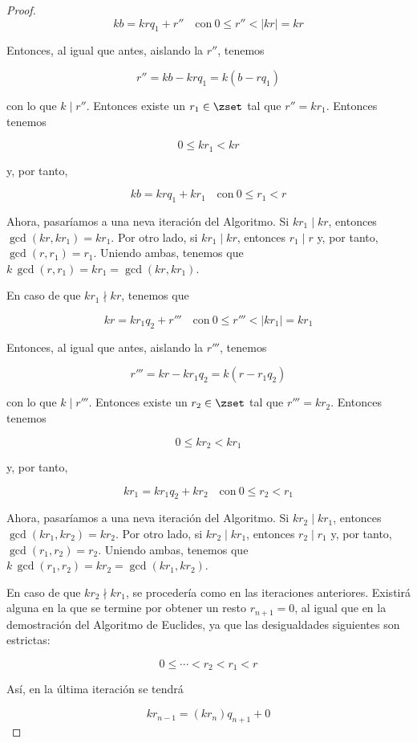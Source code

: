 \begin{proof}
  $$ kb = krq_1 + r'' \quad \text{con} \ 0 \leq r'' < |kr| = kr $$

  Entonces, al igual que antes, aislando la $r''$, tenemos

  $$ r'' = kb - krq_1 = k(b - rq_1) $$

  \noindent con lo que $k \mid r''$. Entonces existe un $r_1 \in \zset$ tal
  que $r'' = k r_1$. Entonces tenemos

  $$ 0 \leq kr_1 < kr $$

  \noindent y, por tanto,

  $$ kb = krq_1 + kr_1 \quad \text{con} \ 0 \leq r_1 < r $$

  Ahora, pasaríamos a una neva iteración del Algoritmo. Si $kr_1 \mid kr$,
  entonces $\gcd(kr, kr_1) = kr_1$. Por otro lado, si $kr_1 \mid kr$,
  entonces $r_1 \mid r$ y, por tanto, $\gcd(r, r_1) = r_1$. Uniendo ambas,
  tenemos que $k \, \gcd(r, r_1) = kr_1 = \gcd(kr, kr_1)$.

  En caso de que $kr_1 \nmid kr$, tenemos que

  $$ kr = kr_1q_2 + r''' \quad \text{con} \ 0 \leq r''' < |kr_1| = kr_1 $$

  Entonces, al igual que antes, aislando la $r'''$, tenemos

  $$ r''' = kr - kr_1q_2 = k(r - r_1q_2) $$

  \noindent con lo que $k \mid r'''$. Entonces existe un $r_2 \in \zset$ tal
  que $r''' = k r_2$. Entonces tenemos

  $$ 0 \leq kr_2 < kr_1 $$

  \noindent y, por tanto,

  $$ kr_1 = kr_1q_2 + kr_2 \quad \text{con} \ 0 \leq r_2 < r_1 $$

  Ahora, pasaríamos a una neva iteración del Algoritmo. Si $kr_2 \mid kr_1$,
  entonces $\gcd(kr_1, kr_2) = kr_2$. Por otro lado, si $kr_2 \mid kr_1$,
  entonces $r_2 \mid r_1$ y, por tanto, $\gcd(r_1, r_2) = r_2$. Uniendo
  ambas, tenemos que $k \, \gcd(r_1, r_2) = kr_2 = \gcd(kr_1, kr_2)$.

  En caso de que $kr_2 \nmid kr_1$, se procedería como en las iteraciones
  anteriores. Existirá alguna en la que se termine por obtener un resto
  $r_{n+1} = 0$, al igual que en la demostración del Algoritmo de Euclides,
  ya que las desigualdades siguientes son estrictas:

  $$ 0 \leq \cdots < r_2 < r_1 < r $$

  Así, en la última iteración se tendrá

  $$ kr_{n-1} = (kr_n)q_{n+1} + 0 $$


\end{proof}
